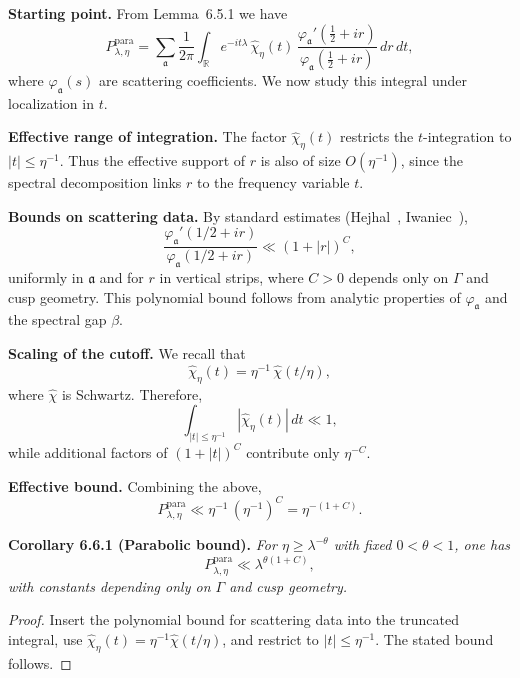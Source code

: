 \medskip

\noindent\textbf{Starting point.}
From Lemma~6.5.1 we have
\[
  P_{\lambda,\eta}^{\mathrm{para}}
  = \sum_\mathfrak{a} \frac{1}{2\pi}\int_\mathbb{R}
  e^{-it\lambda}\, \widehat{\chi}_\eta(t)\,
  \frac{\varphi_\mathfrak{a}'(\tfrac12+ir)}{\varphi_\mathfrak{a}(\tfrac12+ir)}\, dr\, dt,
\]
where $\varphi_\mathfrak{a}(s)$ are scattering coefficients.  
We now study this integral under localization in $t$.

\medskip

\noindent\textbf{Effective range of integration.}
The factor $\widehat{\chi}_\eta(t)$ restricts the $t$-integration to $|t|\le \eta^{-1}$.  
Thus the effective support of $r$ is also of size $O(\eta^{-1})$,  
since the spectral decomposition links $r$ to the frequency variable $t$.

\medskip

\noindent\textbf{Bounds on scattering data.}
By standard estimates (Hejhal~\cite{Hejhal1983}, Iwaniec~\cite{Iwaniec2002}),  
\[
  \frac{\varphi_\mathfrak{a}'(1/2+ir)}{\varphi_\mathfrak{a}(1/2+ir)} \ll (1+|r|)^C,
\]
uniformly in $\mathfrak{a}$ and for $r$ in vertical strips,  
where $C>0$ depends only on $\Gamma$ and cusp geometry.  
This polynomial bound follows from analytic properties of $\varphi_\mathfrak{a}$ and the spectral gap $\beta$.

\medskip

\noindent\textbf{Scaling of the cutoff.}
We recall that
\[
  \widehat{\chi}_\eta(t) = \eta^{-1}\,\widehat{\chi}(t/\eta),
\]
where $\widehat{\chi}$ is Schwartz.  
Therefore,
\[
  \int_{|t|\le \eta^{-1}} |\widehat{\chi}_\eta(t)|\, dt
  \ll 1,
\]
while additional factors of $(1+|t|)^C$ contribute only $\eta^{-C}$.

\medskip

\noindent\textbf{Effective bound.}
Combining the above,
\[
  P_{\lambda,\eta}^{\mathrm{para}} \ll \eta^{-1}\,(\eta^{-1})^C
  = \eta^{-(1+C)}.
\]

\medskip

\noindent\textbf{Corollary 6.6.1 (Parabolic bound).}
\emph{For $\eta\ge \lambda^{-\theta}$ with fixed $0<\theta<1$, one has}
\[
  P_{\lambda,\eta}^{\mathrm{para}} \ll \lambda^{\theta(1+C)},
\]
\emph{with constants depending only on $\Gamma$ and cusp geometry.}

\begin{proof}
Insert the polynomial bound for scattering data into the truncated integral,  
use $\widehat{\chi}_\eta(t)=\eta^{-1}\widehat{\chi}(t/\eta)$,  
and restrict to $|t|\le \eta^{-1}$.  
The stated bound follows.
\end{proof}

